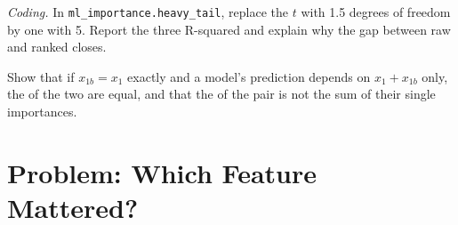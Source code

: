 \begin{exercise}[$\star\star\star$]\label{exo:ml:feature-engineering-selection-and-importance:7}
\emph{Coding.} In \texttt{ml\_importance.heavy\_tail}, replace the $t$ with 1.5 degrees of freedom by one with 5. Report the
three R-squared and explain why the gap between raw and ranked closes.
\end{exercise}

\begin{exercise}[$\star\star\star$]\label{exo:ml:feature-engineering-selection-and-importance:8}
Show that if $x_{1b} = x_1$ exactly and a model's prediction depends on $x_1 + x_{1b}$ only, the  of the
two are equal, and that the  of the pair is not the sum of their single importances.
\end{exercise}

\section{Problem: Which Feature Mattered?}

